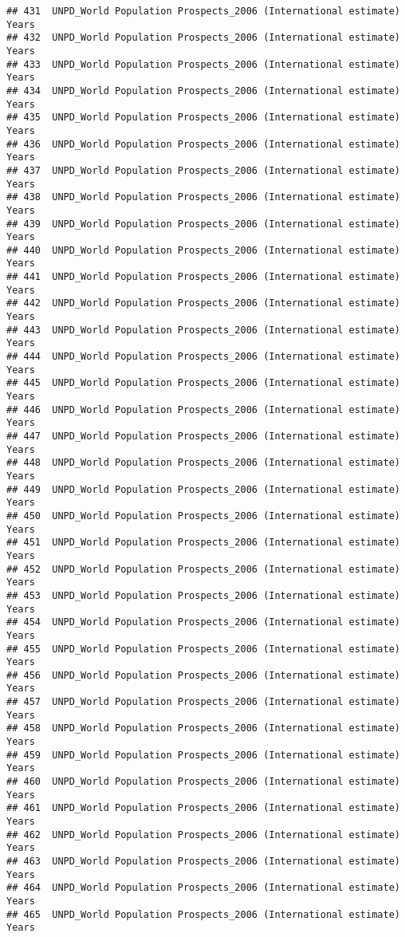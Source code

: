 \documentclass[]{article}
\begin{document}
\begin{verbatim}
## 431  UNPD_World Population Prospects_2006 (International estimate) Years
## 432  UNPD_World Population Prospects_2006 (International estimate) Years
## 433  UNPD_World Population Prospects_2006 (International estimate) Years
## 434  UNPD_World Population Prospects_2006 (International estimate) Years
## 435  UNPD_World Population Prospects_2006 (International estimate) Years
## 436  UNPD_World Population Prospects_2006 (International estimate) Years
## 437  UNPD_World Population Prospects_2006 (International estimate) Years
## 438  UNPD_World Population Prospects_2006 (International estimate) Years
## 439  UNPD_World Population Prospects_2006 (International estimate) Years
## 440  UNPD_World Population Prospects_2006 (International estimate) Years
## 441  UNPD_World Population Prospects_2006 (International estimate) Years
## 442  UNPD_World Population Prospects_2006 (International estimate) Years
## 443  UNPD_World Population Prospects_2006 (International estimate) Years
## 444  UNPD_World Population Prospects_2006 (International estimate) Years
## 445  UNPD_World Population Prospects_2006 (International estimate) Years
## 446  UNPD_World Population Prospects_2006 (International estimate) Years
## 447  UNPD_World Population Prospects_2006 (International estimate) Years
## 448  UNPD_World Population Prospects_2006 (International estimate) Years
## 449  UNPD_World Population Prospects_2006 (International estimate) Years
## 450  UNPD_World Population Prospects_2006 (International estimate) Years
## 451  UNPD_World Population Prospects_2006 (International estimate) Years
## 452  UNPD_World Population Prospects_2006 (International estimate) Years
## 453  UNPD_World Population Prospects_2006 (International estimate) Years
## 454  UNPD_World Population Prospects_2006 (International estimate) Years
## 455  UNPD_World Population Prospects_2006 (International estimate) Years
## 456  UNPD_World Population Prospects_2006 (International estimate) Years
## 457  UNPD_World Population Prospects_2006 (International estimate) Years
## 458  UNPD_World Population Prospects_2006 (International estimate) Years
## 459  UNPD_World Population Prospects_2006 (International estimate) Years
## 460  UNPD_World Population Prospects_2006 (International estimate) Years
## 461  UNPD_World Population Prospects_2006 (International estimate) Years
## 462  UNPD_World Population Prospects_2006 (International estimate) Years
## 463  UNPD_World Population Prospects_2006 (International estimate) Years
## 464  UNPD_World Population Prospects_2006 (International estimate) Years
## 465  UNPD_World Population Prospects_2006 (International estimate) Years

\end{verbatim}
\end{document}
